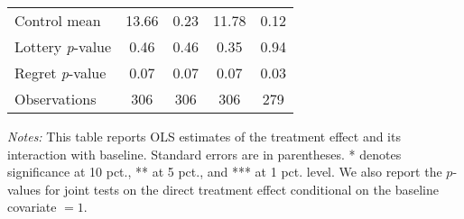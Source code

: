 \begin{table}[htbp]
{\begin{threeparttable}
\begin{tabular}{l*{4}{c}}
Control mean    &    13.66         &     0.23         &    11.78         &     0.12         \\
Lottery \emph{p}-value&     0.46         &     0.46         &     0.35         &     0.94         \\
Regret \emph{p}-value&     0.07         &     0.07         &     0.07         &     0.03         \\
Observations    &      306         &      306         &      306         &      279         \\
\bottomrule \end{tabular} \begin{tablenotes}[flushleft] \footnotesize \item \emph{Notes:} This table reports OLS estimates of the treatment effect and its interaction with baseline. Standard errors are in parentheses. * denotes significance at 10 pct., ** at 5 pct., and *** at 1 pct. level. We also report the \(p\)-values for joint tests on the direct treatment effect conditional on the baseline covariate $= 1$. \end{tablenotes} \end{threeparttable} } \end{table}

